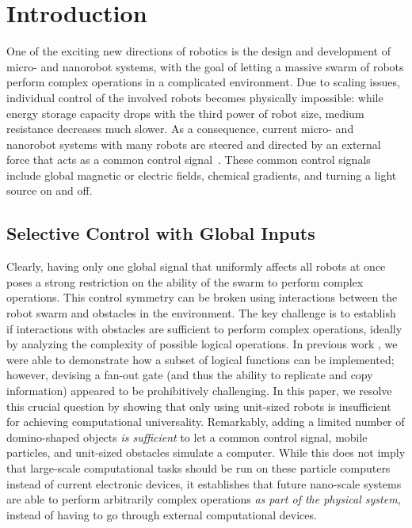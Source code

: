 \section{Introduction}\label{sec:Intro}

One of the exciting new directions of robotics is the design and development
of micro- and nanorobot systems, with the goal of letting a massive swarm of robots
perform complex operations in a complicated environment. Due to scaling 
issues, individual control of the involved robots becomes physically impossible:
while energy storage capacity drops with the third power of robot size,
medium resistance decreases much slower. As a consequence,
current micro- and nanorobot systems with many robots are steered and
directed by an external force that acts as a common control signal~\cite{Donald2013,Chiang2011,Hsi-Wen2012,Diller2013,Jing2013,Ou2013,Lanauze2013}.
These common control signals include global magnetic or electric fields,
chemical gradients, and turning a light source on and off.  

 \subsection{Selective Control with Global Inputs}
Clearly, having only one global signal that uniformly affects all robots at once
poses a strong restriction on the ability of the swarm to perform complex operations.
This control symmetry can be broken using interactions between the robot swarm
and obstacles in the environment. The key challenge is to establish
if interactions with obstacles are sufficient to perform complex operations, ideally by analyzing the complexity of possible logical operations.
 In previous work \cite{Becker2013f,Becker2014,Becker2014a},
we were able to demonstrate how a subset of logical functions can be implemented;
however, devising a fan-out gate (and thus the ability to replicate and copy information)
appeared to be prohibitively challenging. In this paper, we resolve this crucial question by
showing that only using unit-sized robots is insufficient for achieving computational
universality. Remarkably, adding a limited number of domino-shaped objects {\em is sufficient}
to let a common control signal, mobile particles, and unit-sized obstacles
simulate a computer. While this does not imply that large-scale computational 
tasks should be run on these particle computers instead of current electronic
devices, it establishes that future nano-scale systems are able to perform
arbitrarily complex operations {\em as part of the physical system}, instead
of having to go through external computational devices.


